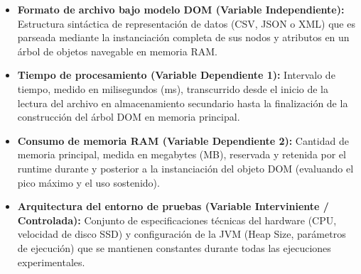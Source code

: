 \begin{itemize}
    \item \textbf{Formato de archivo bajo modelo DOM (Variable Independiente):} Estructura sintáctica de representación de datos (CSV, JSON o XML) que es parseada mediante la instanciación completa de sus nodos y atributos en un árbol de objetos navegable en memoria RAM.
    \item \textbf{Tiempo de procesamiento (Variable Dependiente 1):} Intervalo de tiempo, medido en milisegundos (ms), transcurrido desde el inicio de la lectura del archivo en almacenamiento secundario hasta la finalización de la construcción del árbol DOM en memoria principal.
    \item \textbf{Consumo de memoria RAM (Variable Dependiente 2):} Cantidad de memoria principal, medida en megabytes (MB), reservada y retenida por el runtime durante y posterior a la instanciación del objeto DOM (evaluando el pico máximo y el uso sostenido).
    \item \textbf{Arquitectura del entorno de pruebas (Variable Interviniente / Controlada):} Conjunto de especificaciones técnicas del hardware (CPU, velocidad de disco SSD) y configuración de la JVM (Heap Size, parámetros de ejecución) que se mantienen constantes durante todas las ejecuciones experimentales.
\end{itemize}
